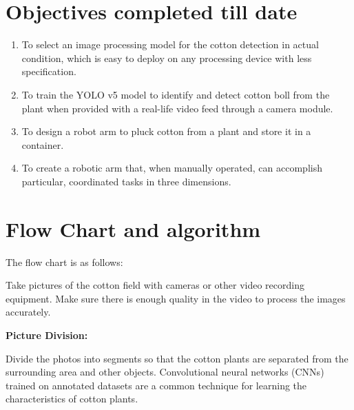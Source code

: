 \documentclass[12pt,a4paper]{report}
\begin{document}
\section {Objectives completed till date}

\begin{enumerate}
\item  To select an image processing model for the cotton detection in actual condition, which is easy to deploy on any processing device with less specification.

\item  To train the YOLO v5 model to identify and detect cotton boll from the plant when provided with a real-life video feed through a camera module.

\item To design a robot arm to pluck cotton from a plant and store it in a container.

\item To create a robotic arm that, when manually operated, can accomplish particular, coordinated tasks in three dimensions.


\end{enumerate}


\newpage
\section {Flow Chart and algorithm} 
\par The flow chart is as follows:


\par Take pictures of the cotton field with cameras or other video recording equipment.
Make sure there is enough quality in the video to process the images accurately.

{\bf{Picture Division:}}

Divide the photos into segments so that the cotton plants are separated from the surrounding area and other objects.
Convolutional neural networks (CNNs) trained on annotated datasets are a common technique for learning the characteristics of cotton plants.
\end{document}
